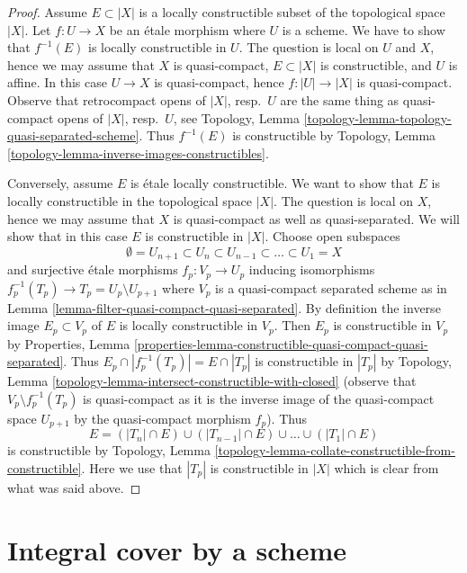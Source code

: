 \begin{proof}
Assume $E \subset |X|$ is a locally constructible subset of
the topological space $|X|$. Let $f : U \to X$ be an
\'etale morphism where $U$ is a scheme. We have to show that
$f^{-1}(E)$ is locally constructible in $U$. The question is
local on $U$ and $X$, hence we may assume that $X$ is quasi-compact,
$E \subset |X|$ is constructible, and $U$ is affine.
In this case $U \to X$ is quasi-compact, hence
$f : |U| \to |X|$ is quasi-compact. Observe that retrocompact
opens of $|X|$, resp.\ $U$ are the same thing as quasi-compact opens
of $|X|$, resp.\ $U$, see
Topology, Lemma \ref{topology-lemma-topology-quasi-separated-scheme}.
Thus $f^{-1}(E)$ is constructible by Topology, Lemma
\ref{topology-lemma-inverse-images-constructibles}.

\medskip\noindent
Conversely, assume $E$ is \'etale locally constructible.
We want to show that $E$ is locally constructible in the
topological space $|X|$.
The question is local on $X$, hence we may assume that $X$ is
quasi-compact as well as quasi-separated. We will show that
in this case $E$ is constructible in $|X|$.
Choose open subspaces
$$
\emptyset = U_{n + 1} \subset
U_n \subset U_{n - 1} \subset \ldots \subset U_1 = X
$$
and surjective \'etale morphisms $f_p : V_p \to U_p$
inducing isomorphisms $f_p^{-1}(T_p) \to T_p = U_p \setminus U_{p + 1}$
where $V_p$ is a quasi-compact separated scheme as in
Lemma \ref{lemma-filter-quasi-compact-quasi-separated}.
By definition the inverse image $E_p \subset V_p$ of $E$ is
locally constructible in $V_p$. Then $E_p$ is constructible in $V_p$
by Properties, Lemma
\ref{properties-lemma-constructible-quasi-compact-quasi-separated}.
Thus $E_p \cap |f_p^{-1}(T_p)| = E \cap |T_p|$ is constructible
in $|T_p|$ by
Topology, Lemma \ref{topology-lemma-intersect-constructible-with-closed}
(observe that $V_p \setminus f_p^{-1}(T_p)$ is quasi-compact as it is the
inverse image of the quasi-compact space $U_{p + 1}$ by the
quasi-compact morphism $f_p$).
Thus
$$
E = (|T_n| \cap E) \cup (|T_{n - 1}| \cap E) \cup \ldots \cup
(|T_1| \cap E)
$$
is constructible by
Topology, Lemma \ref{topology-lemma-collate-constructible-from-constructible}.
Here we use that $|T_p|$ is constructible in $|X|$ which is clear from
what was said above.
\end{proof}





\section{Integral cover by a scheme}
\label{section-integral-cover}

